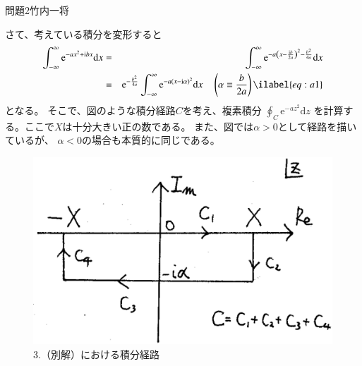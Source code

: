 \documentclass[fleqn]{jbook}
\begin{document}
\begin{answer}{問題2}{竹内一将}
\begin{enumerate}
さて、考えている積分を変形すると
\begin{eqnarray}
 \int_{-\infty}^\infty \mathrm{e}^{-ax^2 + \mathrm{i} bx} \mathrm{d} x
 &=& \int_{-\infty}^\infty \mathrm{e}^{-a \left( x-\frac{\mathrm{i} b}{2a} \right)^2 -\frac{b^2}{4a}} \mathrm{d} x  \notag \\
 &=& \mathrm{e}^{-\frac{b^2}{4a}} \int_{-\infty}^\infty \mathrm{e}^{-a(x-\mathrm{i}\alpha)^2} \mathrm{d} x
 ~~~~\left( \alpha \equiv \frac{b}{2a} \right) \ilabel{eq:a1}
\end{eqnarray}
となる。
そこで、図のような積分経路$C$を考え、複素積分
$\displaystyle{\oint_C \mathrm{e}^{-a z^2} \mathrm{d} z}$
を計算する。ここで$X$は十分大きい正の数である。
また、図では$\alpha>0$として経路を描いているが、
$\alpha<0$の場合も本質的に同じである。
\begin{figure}[bp]
 \begin{center}
  \includegraphics[width=0.4\hsize,clip]{2003math2-1.eps}
 \end{center}
 \caption{3.（別解）における積分経路}
\end{figure}%


\end{enumerate}
\end{answer}
\end{document}

